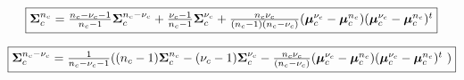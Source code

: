 \documentclass[a4paper,11pt,DIV=16]{scrartcl}
\begin{document}
        \begin{equation}
            \fbox{$\boldsymbol{\Sigma}_c^{n_c} = \frac{n_c-\nu_c-1}{n_c-1} \boldsymbol{\Sigma}_c^{n_c-\nu_c} + \frac{\nu_c-1}{n_c-1} \boldsymbol{\Sigma}_c^{\nu_c} + \frac{n_c \nu_c}{(n_c-1)(n_c-\nu_c)} (\boldsymbol{\mu}_c^{\nu_c}-\boldsymbol{\mu}_c^{n_c})(\boldsymbol{\mu}_c^{\nu_c}-\boldsymbol{\mu}_c^{n_c})^t$}
        \end{equation}

        \begin{equation}
            \fbox{$\boldsymbol{\Sigma}_c^{n_c-\nu_c} = \frac{1}{n_c-\nu_c-1} ( (n_c-1) \boldsymbol{\Sigma}_c^{n_c} - (\nu_c-1) \boldsymbol{\Sigma}_c^{\nu_c} - \frac{n_c \nu_c}{(n_c-\nu_c)} (\boldsymbol{\mu}_c^{\nu_c}-\boldsymbol{\mu}_c^{n_c})(\boldsymbol{\mu}_c^{\nu_c}-\boldsymbol{\mu}_c^{n_c})^t$ )}
        \end{equation}




\end{document}
